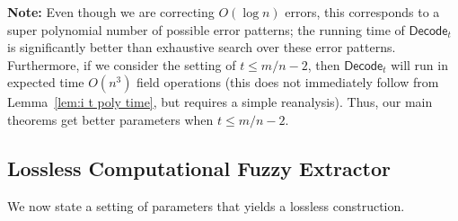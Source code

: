 \documentclass[11pt]{article}
\newcommand{\lemref}[1]{\mbox{Lemma~\ref{#1}}}
\newcommand{\class}[1]{{\ensuremath{\mathsf{#1}}}}
\newcommand{\zo}{\ensuremath{\{0, 1\}}}
\newcommand{\decode}{\ensuremath{\mathsf{Decode}}}
\newcommand{\poly}{\ensuremath{\mathtt{poly}}\xspace}
\newcommand{\ngl}{\ensuremath{\mathtt{ngl}}\xspace}
\newcommand{\LWE}{\class{LWE}}
\newtheorem{theorem}{Theorem}[section]
\begin{document}
\textbf{Note:}
Even though we are correcting $O(\log n)$ errors, this corresponds to a super polynomial number of possible error patterns; the running time of $\decode_t$ is significantly better than exhaustive search over these error patterns. Furthermore, if we consider the setting of $t\leq m/n-2$, then $\decode_t$ will run in expected time $O(n^3)$ field operations (this does not immediately follow from \lemref{lem:i t poly time}, but requires a simple reanalysis).  Thus, our main theorems get  better parameters when  $t\leq m/n-2$.  


\subsection{Lossless Computational Fuzzy Extractor}
\label{sec:lossless extractor}
We now state a setting of parameters that yields a lossless construction.  

\end{document}
